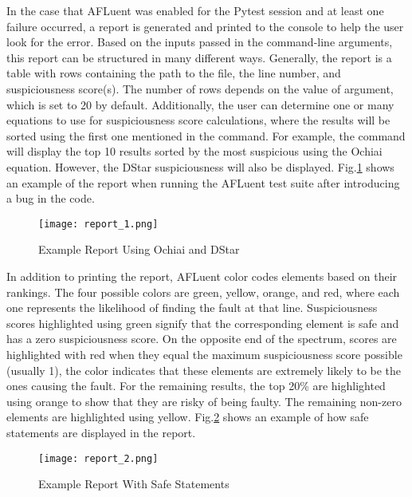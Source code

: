 In the case that AFLuent was enabled for the Pytest session and at least one
failure occurred, a report is generated and printed to the console to help the
user look for the error. Based on the inputs passed in the command-line
arguments, this report can be structured in many different ways. Generally, the
report is a table with rows containing the path to the file, the line number,
and suspiciousness score(s). The number of rows depends on the value of
 argument, which is set to 20 by default. Additionally, the
user can determine one or many equations to use for suspiciousness score
calculations, where the results will be sorted using the first one mentioned in
the command. For example, the command  will display the top 10 results
sorted by the most suspicious using the Ochiai equation. However, the
DStar suspiciousness will also be displayed. Fig.\ref{fig:report_1} shows an
example of the report when running the AFLuent test suite after introducing a
bug in the code.

\begin{figure}[!htb]
	\begin{center}
		\texttt{[image: report\_1.png]}
		\caption{\label{fig:report_1} Example Report Using Ochiai and DStar}
	\end{center}
\end{figure}

In addition to printing the report, AFLuent color codes elements based on their
rankings. The four possible colors are green, yellow, orange, and red, where
each one represents the likelihood of finding the fault at that line.
Suspiciousness scores highlighted using green signify that the corresponding
element is safe and has a zero suspiciousness score. On the opposite end of the
spectrum, scores are highlighted with red when they equal the maximum
suspiciousness score possible (usually 1), the color indicates that these
elements are extremely likely to be the ones causing the fault. For the
remaining results, the top 20\% are highlighted using orange to show that they
are risky of being faulty. The remaining non-zero elements are highlighted using
yellow. Fig.\ref{fig:report_2} shows an example of how safe statements are
displayed in the report.

\begin{figure}[!htb]
	\begin{center}
		\texttt{[image: report\_2.png]}
		\caption{\label{fig:report_2} Example Report With Safe Statements}
	\end{center}
\end{figure}

